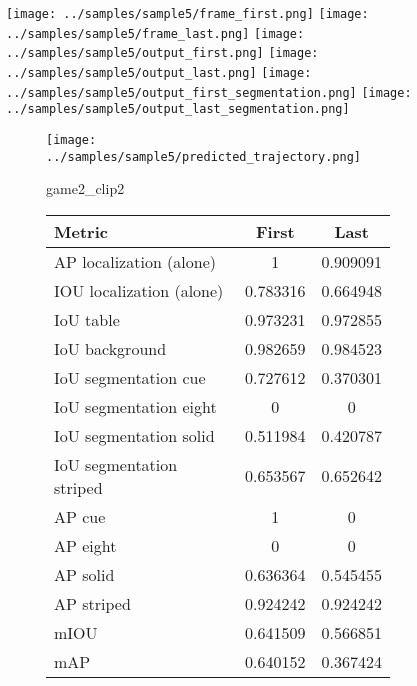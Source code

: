 \begin{figure}
    \texttt{[image: ../samples/sample5/frame\_first.png]}
    \texttt{[image: ../samples/sample5/frame\_last.png]}
    \newline
    \texttt{[image: ../samples/sample5/output\_first.png]}
    \texttt{[image: ../samples/sample5/output\_last.png]}
    \newline
    \texttt{[image: ../samples/sample5/output\_first\_segmentation.png]}
    \texttt{[image: ../samples/sample5/output\_last\_segmentation.png]}
    \newline
    \begin{subfigure}[b]{0.49\textwidth}
        \vspace{20pt}
        \texttt{[image: ../samples/sample5/predicted\_trajectory.png]}
        \caption*{game2\_clip2}
    \end{subfigure}
\begin{subfigure}[b]{0.49\textwidth}
    \begin{tabular}{|l|c|c|}
        \hline
        \textbf{Metric} & \textbf{First} & \textbf{Last} \\
        \hline
        AP localization (alone) & 1 & 0.909091 \\ 
        IOU localization (alone) & 0.783316 & 0.664948 \\ 
        \hline
        IoU table & 0.973231 & 0.972855 \\ 
        IoU background & 0.982659 & 0.984523 \\ 
        \hline
        IoU segmentation cue & 0.727612 & 0.370301 \\ 
        IoU segmentation eight & 0 & 0 \\ 
        IoU segmentation solid & 0.511984 & 0.420787 \\ 
        IoU segmentation striped & 0.653567 & 0.652642 \\ 
        \hline
        AP cue & 1 & 0 \\ 
        AP eight & 0 & 0 \\ 
        AP solid & 0.636364 & 0.545455 \\ 
        AP striped & 0.924242 & 0.924242 \\ 
        \hline
        mIOU & 0.641509 & 0.566851 \\ 
        mAP & 0.640152 & 0.367424 \\ 
        \hline
    \end{tabular}    
\end{subfigure}
\end{figure}

